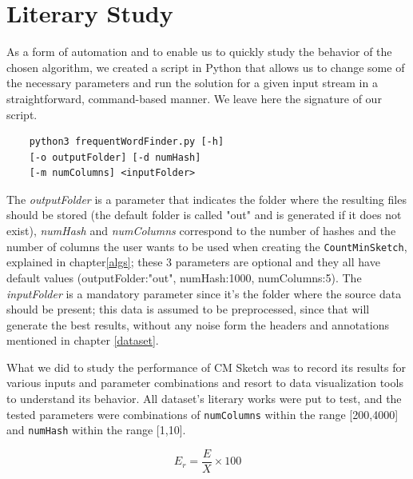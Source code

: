 \documentclass[shortpaper]{revdetua}
\begin{document}
\section{Literary Study} %

As a form of automation and to enable us to quickly study the behavior of the chosen algorithm, we created a script in Python that allows us to change some of 
the necessary parameters and run the solution for a given input stream in a straightforward, command-based manner.
We leave here the signature of our script.

\newpage
\begin{center}
    \begin{verbatim}
    python3 frequentWordFinder.py [-h]
    [-o outputFolder] [-d numHash] 
    [-m numColumns] <inputFolder>
    \end{verbatim}
\end{center}
\vspace{-15pt}

The \textit{outputFolder} is a parameter that indicates the folder where the resulting files should be stored (the default folder is called "out" and is 
generated if it does not exist), \textit{numHash} and \textit{numColumns} correspond to the number of hashes and the number of columns the user wants to be used 
when creating the \texttt{CountMinSketch}, explained in chapter\ref{algs}; these 3 parameters are optional and they all have default values 
(outputFolder:"out", numHash:1000, numColumns:5).
The \textit{inputFolder} is a mandatory parameter since it's the folder where the source data should be present; this data is assumed to be preprocessed, 
since that will generate the best results, without any noise form the headers and annotations mentioned in chapter \ref{dataset}.
\newline

What we did to study the performance of CM Sketch was to record its results for various inputs and parameter combinations and resort to data visualization tools 
to understand its behavior.
All dataset's literary works were put to test, and the tested parameters were combinations of \texttt{numColumns} within the range [200,4000] and 
\texttt{numHash} within the range [1,10].

\vspace{-5pt}
\begin{equation}
    E_{r} = \frac{E}{X} \times 100
    \label{eq:1}
\end{equation}
\end{document}
